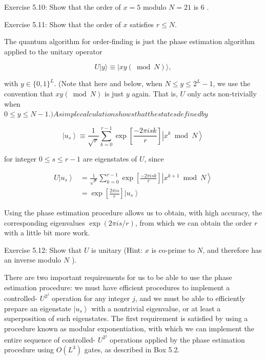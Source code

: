 Exercise 5.10: Show that the order of $x=5$ modulo $N=21$ is 6 .

Exercise 5.11: Show that the order of $x$ satisfies $r \leq N$.

The quantum algorithm for order-finding is just the phase estimation algorithm applied to the unitary operator

\begin{equation*}
U|y\rangle \equiv|x y(\bmod N)\rangle, \tag{5.36}
\end{equation*}

with $y \in\{0,1\}^{L}$. (Note that here and below, when $N \leq y \leq 2^{L}-1$, we use the convention that $x y(\bmod N)$ is just $y$ again. That is, $U$ only acts non-trivially when\\
$0 \leq y \leq N-1$.$) A simple calculation shows that the states defined by$

\begin{equation*}
\left|u_{s}\right\rangle \equiv \frac{1}{\sqrt{r}} \sum_{k=0}^{r-1} \exp \left[\frac{-2 \pi i s k}{r}\right]\left|x^{k} \bmod N\right\rangle \tag{5.37}
\end{equation*}

for integer $0 \leq s \leq r-1$ are eigenstates of $U$, since

\begin{align*}
U\left|u_{s}\right\rangle & =\frac{1}{\sqrt{r}} \sum_{k=0}^{r-1} \exp \left[\frac{-2 \pi i s k}{r}\right]\left|x^{k+1} \bmod N\right\rangle  \tag{5.38}\\
& =\exp \left[\frac{2 \pi i s}{r}\right]\left|u_{s}\right\rangle  \tag{5.39}
\end{align*}

Using the phase estimation procedure allows us to obtain, with high accuracy, the corresponding eigenvalues $\exp (2 \pi i s / r)$, from which we can obtain the order $r$ with a little bit more work.

Exercise 5.12: Show that $U$ is unitary (Hint: $x$ is co-prime to $N$, and therefore has an inverse modulo $N$ ).

There are two important requirements for us to be able to use the phase estimation procedure: we must have efficient procedures to implement a controlled- $U^{2^{j}}$ operation for any integer $j$, and we must be able to efficiently prepare an eigenstate $\left|u_{s}\right\rangle$ with a nontrivial eigenvalue, or at least a superposition of such eigenstates. The first requirement is satisfied by using a procedure known as modular exponentiation, with which we can implement the entire sequence of controlled- $U^{2^{j}}$ operations applied by the phase estimation procedure using $O\left(L^{3}\right)$ gates, as described in Box 5.2.

